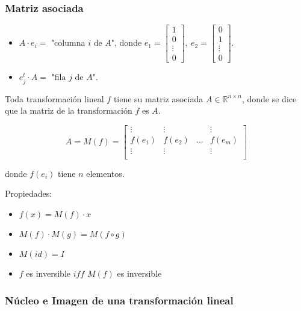 \subsubsection{Matriz asociada}\label{subsubsec:matriz_asociada}

\begin{itemize}
    \item $A\cdot e_i =$ "columna $i$ de $A$", donde $e_1 = 
    \begin{bmatrix}
    1 \\
    0 \\
    \vdots \\
    0
    \end{bmatrix},~ e_2 = 
    \begin{bmatrix}
    0 \\
    1 \\
    \vdots \\
    0
    \end{bmatrix}$.
    \item $e_{j}^{t}\cdot A =$ "fila $j$ de $A$".
\end{itemize}

\noindent Toda transformación lineal $f$ tiene su matriz asociada $A \in \mathbb{R}^{n \times n}$, donde se dice que la matriz de la transformación $f$ es $A$.

\[
A = M(f) = 
\begin{bmatrix}
\vdots & \vdots &  & \vdots \\
f(e_1) & f(e_2) & \ldots & f(e_m) \\
\vdots & \vdots &  & \vdots \\
\end{bmatrix}
\]

donde $f(e_i)$ tiene $n$ elementos.

\noindent Propiedades:

\begin{itemize}
    \item $f(x) = M(f)\cdot x$
    \item $M(f)\cdot M(g) = M(f \circ g)$
    \item $M(id) = I$
    \item $f$ es inversible $iff$ $M(f)$ es inversible
\end{itemize}

\subsubsection{Núcleo e Imagen de una transformación lineal}\label{subsubsec:nucleo_e_imagen_de_tl}

